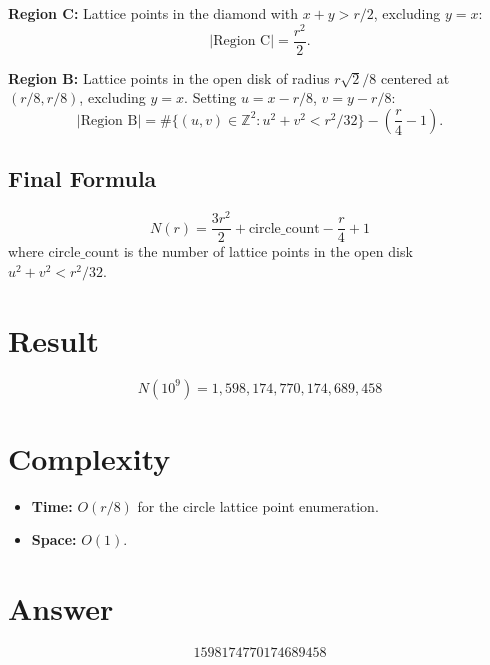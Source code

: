 \documentclass[12pt]{article}
\begin{document}
\textbf{Region C:} Lattice points in the diamond with $x+y > r/2$, excluding $y = x$:
\[
|\text{Region C}| = \frac{r^2}{2}.
\]

\textbf{Region B:} Lattice points in the open disk of radius $r\sqrt{2}/8$ centered at $(r/8, r/8)$, excluding $y = x$. Setting $u = x - r/8$, $v = y - r/8$:
\[
|\text{Region B}| = \#\{(u,v) \in \mathbb{Z}^2 : u^2 + v^2 < r^2/32\} - \left(\frac{r}{4} - 1\right).
\]

\subsection{Final Formula}
\[
N(r) = \frac{3r^2}{2} + \text{circle\_count} - \frac{r}{4} + 1
\]
where $\text{circle\_count}$ is the number of lattice points in the open disk $u^2 + v^2 < r^2/32$.

\section{Result}
\[
\boxed{N(10^9) = 1{,}598{,}174{,}770{,}174{,}689{,}458}
\]

\section{Complexity}
\begin{itemize}
    \item \textbf{Time:} $O(r/8)$ for the circle lattice point enumeration.
    \item \textbf{Space:} $O(1)$.
\end{itemize}

\section{Answer}

\[
\boxed{1598174770174689458}
\]
\end{document}
